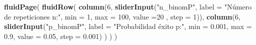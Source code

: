 \documentclass[]{book}
\newenvironment{Shaded}{\begin{snugshade}}{\end{snugshade}}
\newcommand{\DataTypeTok}[1]{\textcolor[rgb]{0.13,0.29,0.53}{#1}}
\newcommand{\DecValTok}[1]{\textcolor[rgb]{0.00,0.00,0.81}{#1}}
\newcommand{\FloatTok}[1]{\textcolor[rgb]{0.00,0.00,0.81}{#1}}
\newcommand{\KeywordTok}[1]{\textcolor[rgb]{0.13,0.29,0.53}{\textbf{#1}}}
\newcommand{\NormalTok}[1]{#1}
\newcommand{\StringTok}[1]{\textcolor[rgb]{0.31,0.60,0.02}{#1}}
\begin{document}
\begin{Shaded}
\begin{Highlighting}[]
\KeywordTok{fluidPage}\NormalTok{(}
\KeywordTok{fluidRow}\NormalTok{(}
  \KeywordTok{column}\NormalTok{(}\DecValTok{6}\NormalTok{,}
         \KeywordTok{sliderInput}\NormalTok{(}\StringTok{"n_binomP"}\NormalTok{, }\DataTypeTok{label =} \StringTok{"Número de repeticiones n:"}\NormalTok{,}
              \DataTypeTok{min =} \DecValTok{1}\NormalTok{, }\DataTypeTok{max =} \DecValTok{100}\NormalTok{, }\DataTypeTok{value =}\DecValTok{20}\NormalTok{ , }\DataTypeTok{step =} \DecValTok{1}\NormalTok{)),}
  \KeywordTok{column}\NormalTok{(}\DecValTok{6}\NormalTok{,}
          \KeywordTok{sliderInput}\NormalTok{(}\StringTok{"p_binomP"}\NormalTok{, }\DataTypeTok{label =} \StringTok{"Probabilidad éxito p:"}\NormalTok{,}
                     \DataTypeTok{min =} \FloatTok{0.001}\NormalTok{, }\DataTypeTok{max =} \FloatTok{0.9}\NormalTok{, }\DataTypeTok{value =} \FloatTok{0.05}\NormalTok{, }\DataTypeTok{step =} \FloatTok{0.001}\NormalTok{)}
\NormalTok{         )}
\NormalTok{  )}
\NormalTok{)}


\end{Highlighting}
\end{Shaded}
\end{document}

